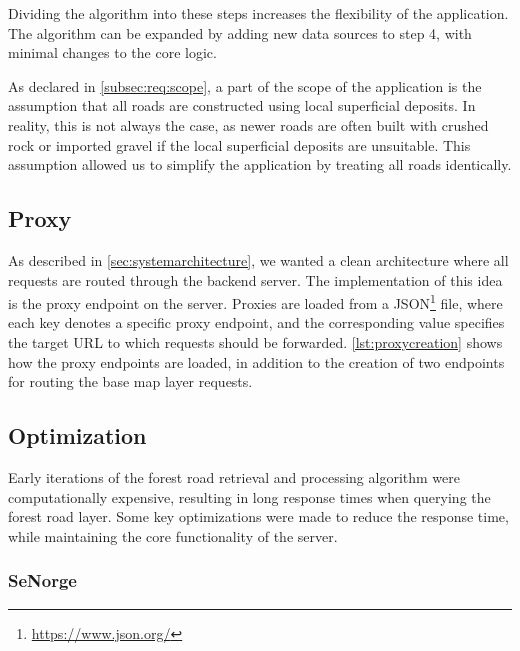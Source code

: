 Dividing the algorithm into these steps increases the flexibility of the application. The algorithm can be expanded by adding new data sources to step 4, with minimal changes to the core logic.

As declared in \autoref{subsec:req:scope}, a part of the scope of the application is the assumption that all roads are constructed using local superficial deposits. In reality, this is not always the case, as newer roads are often built with crushed rock or imported gravel if the local superficial deposits are unsuitable. This assumption allowed us to simplify the application by treating all roads identically.

\subsection{Proxy}\label{subsec:server:proxy}

As described in \autoref{sec:systemarchitecture}, we wanted a clean architecture where all requests are routed through the backend server. The implementation of this idea is the proxy endpoint on the server. Proxies are loaded from a JSON\footnote{\url{https://www.json.org/}} file, where each key denotes a specific proxy endpoint, and the corresponding value specifies the target URL to which requests should be forwarded. \autoref{lst:proxycreation} shows how the proxy endpoints are loaded, in addition to the creation of two endpoints for routing the base map layer requests. 

\begin{figure}[h]

\end{figure}

\subsection{Optimization}\label{subsec:server:optimization}

Early iterations of the forest road retrieval and processing algorithm were computationally expensive, resulting in long response times when querying the forest road layer. Some key optimizations were made to reduce the response time, while maintaining the core functionality of the server.

\subsubsection{SeNorge}\label{subsubsec:implementation:optimization:senorge}

